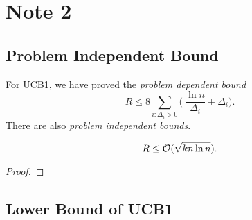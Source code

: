 \newpage
\section{Note 2}

\subsection{Problem Independent Bound} %

For UCB1, we have proved the \emph{problem dependent bound}
\begin{equation}
    R\le 8 \sum_{i:\Delta_i>0} \bigg(~\frac{\ln n}{\Delta_i}+\Delta_i\bigg).
\end{equation}
There are also \emph{problem independent bounds}.

\begin{thm}
    \begin{equation}
        R\le\mathcal{O}(\sqrt{kn\ln n}).
    \end{equation}
\end{thm}
\begin{proof}

\end{proof}

\subsection{Lower Bound of UCB1} %
